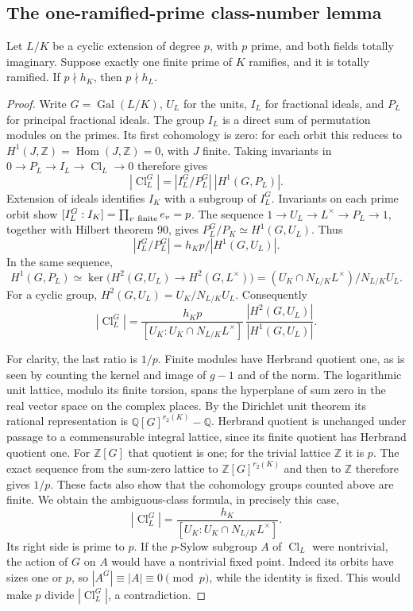 \subsection{The one-ramified-prime class-number lemma}
\begin{srlemma}\label{lem:sr-oneprime}
Let \(L/K\) be a cyclic extension of degree \(p\), with \(p\) prime,
and both fields totally imaginary. Suppose exactly one finite prime
of \(K\) ramifies, and it is totally ramified. If
\(p\nmid h_K\), then \(p\nmid h_L\).
\end{srlemma}
\begin{proof}
Write \(G=\operatorname{Gal}(L/K)\), \(U_L\) for the units,
\(I_L\) for fractional ideals, and \(P_L\) for principal fractional ideals.
The group \(I_L\) is a direct sum of permutation modules on the primes.
Its first cohomology is zero: for each orbit this reduces to
\(H^1(J,\mathbb Z)=\operatorname{Hom}(J,\mathbb Z)=0\), with \(J\) finite.
Taking invariants in \(0\to P_L\to I_L\to\operatorname{Cl}_L\to0\)
therefore gives
\[
 |\operatorname{Cl}_L^G|
   =|I_L^G/P_L^G|\ |H^1(G,P_L)|.
\]
Extension of ideals identifies \(I_K\) with a subgroup of \(I_L^G\).
Invariants on each prime orbit show
\([I_L^G:I_K]=\prod_{v\ {\rm finite}}e_v=p\).
The sequence \(1\to U_L\to L^\times\to P_L\to1\), together with
Hilbert theorem 90, gives
\(P_L^G/P_K\simeq H^1(G,U_L)\). Thus
\[
 |I_L^G/P_L^G|=h_Kp/|H^1(G,U_L)|.
\]
In the same sequence,
\[
 H^1(G,P_L)\simeq
 \ker\bigl(H^2(G,U_L)\to H^2(G,L^\times)\bigr)
 = (U_K\cap N_{L/K}L^\times)/N_{L/K}U_L.
\]
For a cyclic group, \(H^2(G,U_L)=U_K/N_{L/K}U_L\).
Consequently
\[
 |\operatorname{Cl}_L^G|
 =\frac{h_Kp}{[U_K:U_K\cap N_{L/K}L^\times]}\,
       \frac{|H^2(G,U_L)|}{|H^1(G,U_L)|}.
\]

For clarity, the last ratio is \(1/p\).
Finite modules have Herbrand quotient one, as is seen by counting the
kernel and image of \(g-1\) and of the norm.
The logarithmic unit lattice, modulo its finite torsion, spans the
hyperplane of sum zero in the real vector space on the complex places.
By the Dirichlet unit theorem its rational representation is
\(\mathbb Q[G]^{r_2(K)}-\mathbb Q\).
Herbrand quotient is unchanged under passage to a commensurable
integral lattice, since its finite quotient has Herbrand quotient one.
For \(\mathbb Z[G]\) that quotient is one; for the trivial lattice
\(\mathbb Z\) it is \(p\).
The exact sequence from the sum-zero lattice to
\(\mathbb Z[G]^{r_2(K)}\) and then to \(\mathbb Z\) therefore gives \(1/p\).
These facts also show that the cohomology groups counted above are finite.
We obtain the ambiguous-class formula, in precisely this case,
\[
 |\operatorname{Cl}_L^G|
 =\frac{h_K}{[U_K:U_K\cap N_{L/K}L^\times]}.
\]
Its right side is prime to \(p\).
If the \(p\)-Sylow subgroup \(A\) of \(\operatorname{Cl}_L\) were
nontrivial, the action of \(G\) on \(A\) would have a nontrivial fixed
point. Indeed its orbits have sizes one or \(p\), so
\(|A^G|\equiv|A|\equiv0\pmod p\), while the identity is fixed.
This would make \(p\) divide \(|\operatorname{Cl}_L^G|\), a contradiction.
\end{proof}

